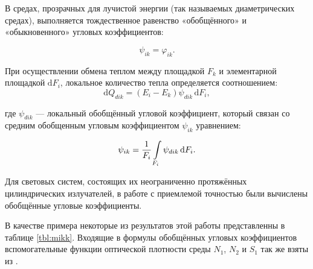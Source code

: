 В средах, прозрачных для лучистой энергии (так называемых диаметрических средах), выполняется тождественное равенство «обобщённого» и «обыкновенного» угловых коэффициентов:

\begin{equation}
	\psi_{ik} = \varphi_{ik}.
\end{equation}

При осуществлении обмена теплом между площадкой $F_k$ и элементарной площадкой $\mathrm dF_i$, локальное количество тепла определяется соотношением:
\begin{equation}
	\mathrm dQ_{dik} = (E_i - E_k) \psi_{dik} \,\mathrm dF_i,
\end{equation}

\noindent где $\psi_{dik}$ — локальный обобщённый угловой коэффициент, который связан со средним обобщенным угловым коэффициентом $\psi_{ik}$ уравнением:

\begin{equation}
	\psi_{ik} = \frac{1}{F_i} \int\displaylimits_{F_i} \psi_{dik} \,\mathrm dF_i.
\end{equation}

Для световых систем, состоящих их неограниченно протяжённых цилиндрических излучателей, в работе \cite{mikk} с приемлемой точностью были вычислены обобщённые угловые коэффициенты.

В качестве примера некоторые из результатов этой работы представленны в таблице \ref{tbl:mikk}.
Входящие в формулы обобщённых угловых коэффициентов вспомогательные функции оптической плотности среды $N_1$, $N_2$ и $S_1$ так же взяты из \cite{mikk}.

